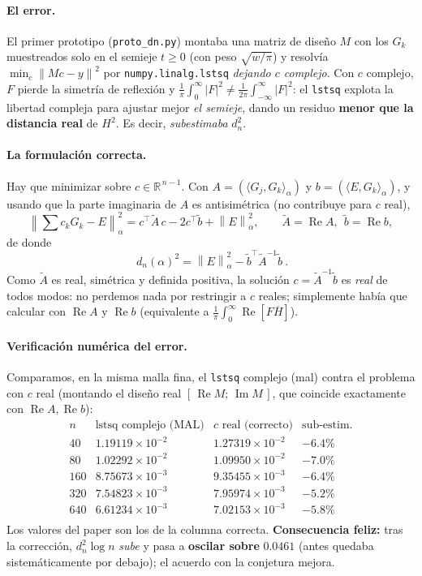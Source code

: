 \documentclass[11pt]{article}
\newcommand{\R}{\mathbb{R}}
\newcommand{\Reop}{\operatorname{Re}}
\newcommand{\Imop}{\operatorname{Im}}
\newcommand{\norm}[1]{\left\|#1\right\|}
\newcommand{\code}[1]{\texttt{#1}}
\begin{document}
\paragraph{El error.} El primer prototipo (\code{proto\_dn.py}) montaba una matriz de
dise\~no $M$ con los $G_k$ muestreados solo en el semieje $t\ge0$ (con peso
$\sqrt{w/\pi}$) y resolv\'ia $\min_c\norm{Mc-y}^2$ por \code{numpy.linalg.lstsq}
\emph{dejando $c$ complejo}. Con $c$ complejo, $F$ pierde la simetr\'ia de reflexi\'on
y $\frac1\pi\int_0^\infty|F|^2 \ne \frac1{2\pi}\int_{-\infty}^{\infty}|F|^2$: el
\code{lstsq} explota la libertad compleja para ajustar mejor \emph{el semieje},
dando un residuo \textbf{menor que la distancia real} de $H^2$. Es decir,
\emph{subestimaba} $d_n^2$.

\paragraph{La formulaci\'on correcta.} Hay que minimizar sobre $c\in\R^{\,n-1}$. Con
$A=(\langle G_j,G_k\rangle_\alpha)$ y $b=(\langle E,G_k\rangle_\alpha)$, y usando que la
parte imaginaria de $A$ es antisim\'etrica (no contribuye para $c$ real),
\[
\norm{\textstyle\sum c_kG_k-E}_\alpha^2
=c^{\top}\tilde A\,c-2c^{\top}\tilde b+\norm{E}_\alpha^2,\qquad
\tilde A=\Reop A,\ \ \tilde b=\Reop b,
\]
de donde
\[
\boxed{\ d_n(\alpha)^2=\norm{E}_\alpha^2-\tilde b^{\top}\tilde A^{-1}\tilde b\ }.
\]
Como $\tilde A$ es real, sim\'etrica y definida positiva, la soluci\'on $c=\tilde
A^{-1}\tilde b$ es \emph{real} de todos modos: no perdemos nada por restringir a
$c$ reales; simplemente hab\'ia que calcular con $\Reop A$ y $\Reop b$ (equivalente a
$\frac1\pi\int_0^\infty\Reop[F\overline H]$).

\paragraph{Verificaci\'on num\'erica del error.} Comparamos, en la misma malla fina,
el \code{lstsq} complejo (mal) contra el problema con $c$ real (montando el dise\~no
real $[\,\Reop M;\,\Imop M\,]$, que coincide exactamente con $\Reop A,\Reop b$):
\[
\begin{array}{r|ccc}
n & \text{lstsq complejo (MAL)} & \text{$c$ real (correcto)} & \text{sub-estim.}\\
\hline
40  & 1.19119\times10^{-2} & 1.27319\times10^{-2} & -6.4\%\\
80  & 1.02292\times10^{-2} & 1.09950\times10^{-2} & -7.0\%\\
160 & 8.75673\times10^{-3} & 9.35455\times10^{-3} & -6.4\%\\
320 & 7.54823\times10^{-3} & 7.95974\times10^{-3} & -5.2\%\\
640 & 6.61234\times10^{-3} & 7.02153\times10^{-3} & -5.8\%\\
\end{array}
\]
Los valores del paper son los de la columna correcta. \textbf{Consecuencia feliz:} tras
la correcci\'on, $d_n^2\log n$ \emph{sube} y pasa a \textbf{oscilar sobre} $0.0461$ (antes
quedaba sistem\'aticamente por debajo); el acuerdo con la conjetura mejora.
\end{document}
